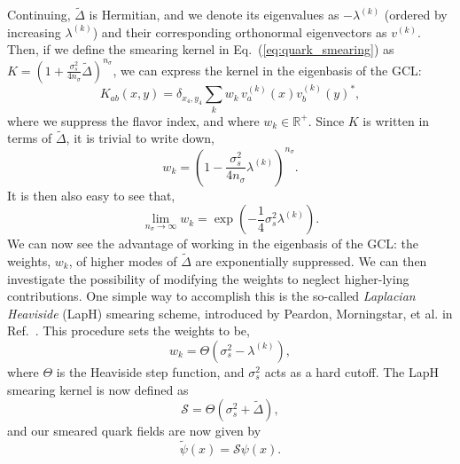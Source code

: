     Continuing, $\widetilde\Delta$ is Hermitian, and we denote its eigenvalues as $-\lambda^{(k)}$ (ordered by increasing $\lambda^{(k)}$) and their corresponding orthonormal eigenvectors as $v^{(k)}$. Then, if we define the smearing kernel in Eq.~(\ref{eq:quark_smearing}) as $K=\left(1+\frac{\sigma_{s}^{2}}{4 n_{\sigma}} \widetilde{\Delta}\right)^{n_{\sigma}}$, we can express the kernel in the eigenbasis of the GCL:
    \begin{equation}
        K_{a b}(x, y)=\delta_{x_{4}, y_{4}} \sum_{k} w_{k}\,v_{a}^{(k)}(x) v_{b}^{(k)}(y)^{*},
    \end{equation}
    where we suppress the flavor index, and where $w_k\in\mathbb{R}^+$. Since $K$ is written in terms of $\widetilde\Delta$, it is trivial to write down,
    \begin{equation}
        w_{k}=\left(1-\frac{\sigma_{s}^{2}}{4 n_{\sigma}} \lambda^{(k)}\right)^{n_{\sigma}}.
    \end{equation}
    It is then also easy to see that,
    \begin{equation}
        \lim _{n_{\sigma} \rightarrow \infty} w_{k}=\exp \left(-\frac{1}{4} \sigma_{s}^{2} \lambda^{(k)}\right).
    \end{equation}
    We can now see the advantage of working in the eigenbasis of the GCL: the weights, $w_{k}$, of higher modes of $\widetilde\Delta$ are exponentially suppressed. We can then investigate the possibility of modifying the weights to neglect higher-lying contributions. One simple way to accomplish this is the so-called \emph{Laplacian Heaviside} (LapH) smearing scheme, introduced by Peardon, Morningstar, et al. in Ref.~\cite{Peardon:2009gh}. This procedure sets the weights to be,
    \begin{equation}
        w_{k}=\Theta\left(\sigma_{s}^{2}-\lambda^{(k)}\right),
    \end{equation}
    where $\Theta$ is the Heaviside step function, and $\sigma_s^2$ acts as a hard cutoff. The LapH smearing kernel is now defined as
    \begin{equation}\label{eq:smearing_operator}
        \mathcal{S}=\Theta\left(\sigma_{s}^{2}+\widetilde{\Delta}\right),
    \end{equation}
    and our smeared quark fields are now given by
    \begin{equation}
        \widetilde\psi(x) = \mathcal{S}\psi(x).
    \end{equation}


